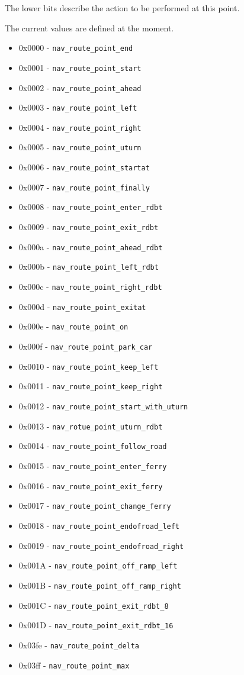 \documentclass[a4paper]{article}
\begin{document}
The lower bits describe the action to be performed at this point.

The current values are defined at the moment.
\begin{itemize}
\item  0x0000 - {\tt nav\_route\_point\_end}
\item  0x0001 - {\tt nav\_route\_point\_start}
\item  0x0002 - {\tt  nav\_route\_point\_ahead     }
\item  0x0003 - {\tt  nav\_route\_point\_left      }
\item  0x0004 - {\tt  nav\_route\_point\_right     }
\item  0x0005 - {\tt  nav\_route\_point\_uturn     }
\item  0x0006 - {\tt  nav\_route\_point\_startat   }
\item  0x0007 - {\tt  nav\_route\_point\_finally   }
\item  0x0008 - {\tt  nav\_route\_point\_enter\_rdbt}
\item  0x0009 - {\tt  nav\_route\_point\_exit\_rdbt }
\item  0x000a - {\tt  nav\_route\_point\_ahead\_rdbt}
\item  0x000b - {\tt  nav\_route\_point\_left\_rdbt }
\item  0x000c - {\tt  nav\_route\_point\_right\_rdbt}
\item  0x000d - {\tt  nav\_route\_point\_exitat    }
\item  0x000e - {\tt  nav\_route\_point\_on        }
\item  0x000f - {\tt  nav\_route\_point\_park\_car  }
\item  0x0010 - {\tt  nav\_route\_point\_keep\_left }
\item  0x0011 - {\tt  nav\_route\_point\_keep\_right}
\item  0x0012 - {\tt  nav\_route\_point\_start\_with\_uturn}
\item  0x0013 - {\tt  nav\_rotue\_point\_uturn\_rdbt}
\item  0x0014 - {\tt  nav\_route\_point\_follow\_road}
\item  0x0015 - {\tt  nav\_route\_point\_enter\_ferry}
\item  0x0016 - {\tt  nav\_route\_point\_exit\_ferry}
\item  0x0017 - {\tt  nav\_route\_point\_change\_ferry}
\item  0x0018 - {\tt  nav\_route\_point\_endofroad\_left}
\item  0x0019 - {\tt  nav\_route\_point\_endofroad\_right}
\item  0x001A - {\tt  nav\_route\_point\_off\_ramp\_left}
\item  0x001B - {\tt  nav\_route\_point\_off\_ramp\_right}
\item  0x001C - {\tt  nav\_route\_point\_exit\_rdbt\_8}
\item  0x001D - {\tt  nav\_route\_point\_exit\_rdbt\_16}
\item  0x03fe - {\tt  nav\_route\_point\_delta      }
\item  0x03ff - {\tt  nav\_route\_point\_max       }

\end{itemize}
\end{document}

